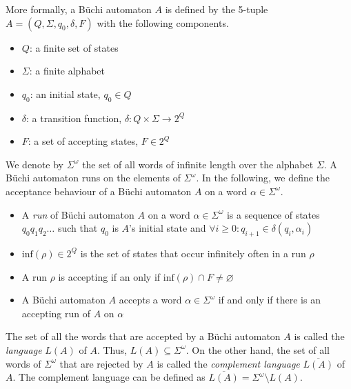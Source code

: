 \documentclass{scrreprt}
\newcommand{\om}{{$\omega$}}
\begin{document}
More formally, a Büchi automaton $A$ is defined by the 5-tuple $A = (Q, \Sigma, q_0, \delta, F)$ with the following components.
\begin{itemize}
\item $Q$: a finite set of states
\item $\Sigma$: a finite alphabet
\item $q_0$: an initial state, $q_0 \in Q$
\item $\delta$: a transition function, $\delta: Q \times \Sigma \rightarrow 2^Q$ %
\item $F$: a set of accepting states, $F \in 2^Q$
\end{itemize}

We denote by $\Sigma^\omega$ the set of all words of infinite length over the alphabet $\Sigma$. A Büchi automaton runs on the elements of $\Sigma^\omega$. In the following, we define the acceptance behaviour of a Büchi automaton $A$ on a word $\alpha \in \Sigma^\omega$.



\begin{itemize}
\item A \emph{run} of Büchi automaton $A$ on a word $\alpha \in \Sigma^\omega$ is a sequence of states $q_0q_1q_2\dots$ such that $q_0$ is $A$'s initial state and $\forall i \geq 0: q_{i+1} \in \delta(q_i, \alpha_i)$
\item $\textrm{inf}(\rho) \in 2^Q$ is the set of states that occur infinitely often in a run $\rho$
\item A run $\rho$ is accepting if an only if $\textrm{inf}(\rho) \cap F \neq \varnothing$
\item A Büchi automaton $A$ accepts a word $\alpha \in \Sigma^\omega$ if and only if there is an accepting run of $A$ on $\alpha$
\end{itemize}

The set of all the words that are accepted by a Büchi automaton $A$ is called the \emph{language} $L(A)$ of $A$. Thus, $L(A) \subseteq \Sigma^\omega$. On the other hand, the set of all words of $\Sigma^\omega$ that are rejected by $A$ is called the \emph{complement language} $\overline{L(A)}$ of $A$. The complement language can be defined as $\overline{L(A)} = \Sigma^\omega \setminus L(A)$.
\end{document}
